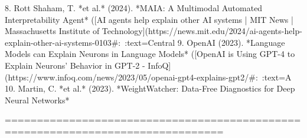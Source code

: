 8. Rott Shaham, T. *et al.* (2024). *MAIA: A Multimodal Automated Interpretability Agent* ([AI agents help explain other AI systems | MIT News | Massachusetts Institute of Technology](https://news.mit.edu/2024/ai-agents-help-explain-other-ai-systems-0103#:~:text=Central%
9. OpenAI (2023). *Language Models can Explain Neurons in Language Models* ([OpenAI is Using GPT-4 to Explain Neurons' Behavior in GPT-2 - InfoQ](https://www.infoq.com/news/2023/05/openai-gpt4-explains-gpt2/#:~:text=A%
10. Martin, C. *et al.* (2023). *WeightWatcher: Data-Free Diagnostics for Deep Neural Networks*

================================================================================

